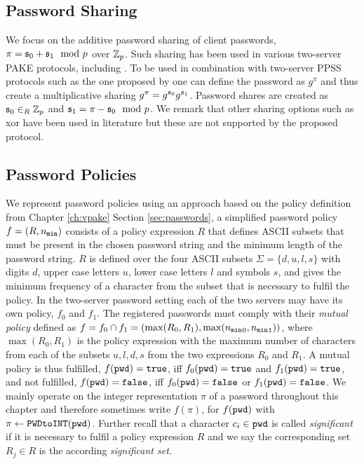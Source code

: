 \subsection{Password Sharing}
We focus on the additive password sharing of client passwords, \ie $\pi=\mathfrak{s}_0+\mathfrak{s}_1 \mod p$ over $\mathbb{Z}_p$.
Such sharing has been used in various two-server \ac{PAKE} protocols, including \cite{Katz2012a,Yang_Deng_Bao_2006,Jin_Wong_Xu_2007}.
To be used in combination with two-server \ac{PPSS} protocols such as the one proposed by \citet{Camenisch2012} one can define the password as $g^\pi$ and thus create a multiplicative sharing $g^\pi=g^{\mathfrak{s}_0}g^{\mathfrak{s}_1}$.
Password shares are created as $\mathfrak{s}_0\in_R\mathbb{Z}_p$ and $\mathfrak{s}_1=\pi-\mathfrak{s}_0 \mod p$.
We remark that other sharing options such as xor \cite{BrainardJKS03,SzydloK05} have been used in literature but these are not supported by the proposed protocol.


\subsection{Password Policies}
We represent password policies using an approach based on the policy definition from Chapter \ref{ch:vpake} Section \ref{sec:passwords}, \ie a simplified password policy $f=(R,{n_\mathtt{min}})$ consists of a policy expression $R$ that defines \ac{ASCII} subsets that must be present in the chosen password string and the minimum length \pmin of the password string.
$R$ is defined over the four \ac{ASCII} subsets $\Sigma=\{d,u,l,s\}$ with digits $d$, upper case letters $u$, lower case letters $l$ and symbols $s$, and gives the minimum frequency of a character from the subset that is necessary to fulfil the policy.
In the two-server password setting each of the two servers may have its own policy, \ie $f_0$ and $f_1$.
The registered passwords must comply with their \emph{mutual policy} defined as $f=f_0\cap f_1=(\max(R_0,R_1),\max({n_\mathtt{min}}_0,{n_\mathtt{min}}_1))$, where $\max(R_0,R_1)$ is the policy expression with the maximum number of characters from each of the subsets $u,l,d,s$ from the two expressions $R_0$ and $R_1$.
A mutual policy is thus fulfilled, \ie $f(\mathtt{pwd})=\mathtt{true}$, iff $f_0(\mathtt{pwd})=\mathtt{true}$ and $f_1(\mathtt{pwd})=\mathtt{true}$, and not fulfilled, \ie $f(\mathtt{pwd})=\mathtt{false}$, iff $f_0(\mathtt{pwd})=\mathtt{false}$ or $f_1(\mathtt{pwd})=\mathtt{false}$.
We mainly operate on the integer representation $\pi$ of a password \pwd throughout this chapter and therefore sometimes write $f(\pi)$, for $f(\mathtt{pwd})$ with $\pi\gets\texttt{PWDtoINT}(\mathtt{pwd})$.
Further recall that a character $c_i\in\mathtt{pwd}$ is called \emph{significant} if it is necessary to fulfil a policy expression $R$ and we say the corresponding set $R_j\in R$ is the according \emph{significant set}.
